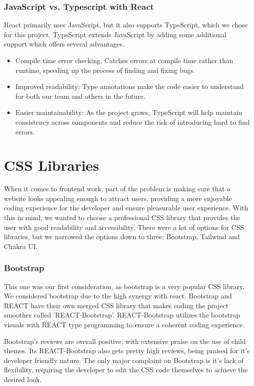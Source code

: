 \documentclass[12pt,titlepage]{article}
\begin{document}
\subsubsection{JavaScript vs. Typescript with React}
React primarily uses JavaScript, but it also supports TypeScript, which we chose for this project. TypeScript extends JavaScript by adding some additional support which offers several advantages. 
\begin{itemize}
	\item Compile time error checking. Catches errors at compile time rather than runtime, speeding up the process of finding and fixing bugs.
	\item Improved readability: Type annotations make the code easier to understand for both our team and others in the future. 
	\item Easier maintainability: As the project grows, TypeScript will help maintain consistency across components and reduce the risk of introducing hard to find errors.
\end{itemize}

\section{CSS Libraries}

When it comes to frontend work, part of the problem is making sure that a website looks appealing enough to attract users, providing a more enjoyable coding experience for the developer and ensure pleasurable user experience. %
With this in mind, we wanted to choose a professional CSS library that provides the user with good readability and accessibility.
There were a lot of options for CSS libraries, but we narrowed the options down to three: Bootstrap, Tailwind and Chakra UI.

\subsubsection{Bootstrap} 
This one was our first consideration, as bootstrap is a very popular CSS library. 
We considered bootstrap due to the high synergy with react. 
Bootstrap and REACT have their own merged CSS library that makes coding the project smoother called 'REACT-Bootstrap'.
REACT-Bootstrap utilizes the bootstrap visuals with REACT type programming to ensure a coherent coding experience.

Bootstrap's reviews are overall positive, with extensive praise on the use of child themes.
Its REACT-Bootstrap also gets pretty high reviews, being praised for it's developer friendly nature.
The only major complaint on Bootstrap is it's lack of flexibility, requiring the developer to edit the CSS code themselves to achieve the desired look.
\end{document}
